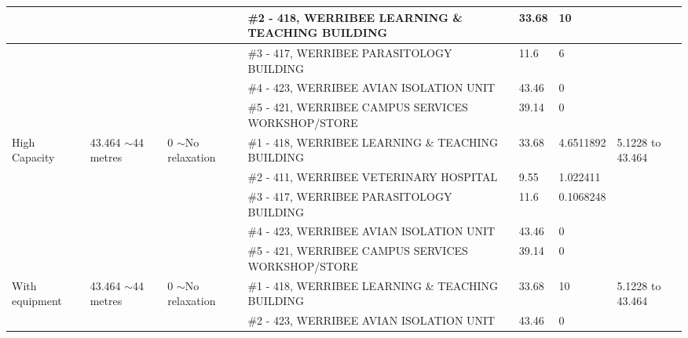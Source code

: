 \begin{table}[H]
{\begin{tabular}{|l|l|l|l|l|l|l|}
                        &                          &                          & \#2 - 418, WERRIBEE LEARNING \& TEACHING BUILDING  & 33.68         & 10              &                           \\ \hline
                        &                          &                          & \#3 - 417, WERRIBEE PARASITOLOGY BUILDING          & 11.6          & 6               &                           \\ \hline
                        &                          &                          & \#4 - 423, WERRIBEE AVIAN ISOLATION UNIT           & 43.46         & 0               &                           \\ \hline
                        &                          &                          & \#5 - 421, WERRIBEE CAMPUS SERVICES WORKSHOP/STORE & 39.14         & 0               &                           \\ \hline
High Capacity           & 43.464 $\sim$44 metres   & 0 $\sim$No relaxation    & \#1 - 418, WERRIBEE LEARNING \& TEACHING BUILDING  & 33.68         & 4.6511892       & 5.1228 to 43.464          \\ \hline
                        &                          &                          & \#2 - 411, WERRIBEE VETERINARY HOSPITAL            & 9.55          & 1.022411        &                           \\ \hline
                        &                          &                          & \#3 - 417, WERRIBEE PARASITOLOGY BUILDING          & 11.6          & 0.1068248       &                           \\ \hline
                        &                          &                          & \#4 - 423, WERRIBEE AVIAN ISOLATION UNIT           & 43.46         & 0               &                           \\ \hline
                        &                          &                          & \#5 - 421, WERRIBEE CAMPUS SERVICES WORKSHOP/STORE & 39.14         & 0               &                           \\ \hline
With equipment         & 43.464 $\sim$44 metres   & 0 $\sim$No relaxation    & \#1 - 418, WERRIBEE LEARNING \& TEACHING BUILDING  & 33.68         & 10              & 5.1228 to 43.464          \\ \hline
                        &                          &                          & \#2 - 423, WERRIBEE AVIAN ISOLATION UNIT           & 43.46         & 0               &                           \\ \hline

\end{tabular}}
\end{table}
